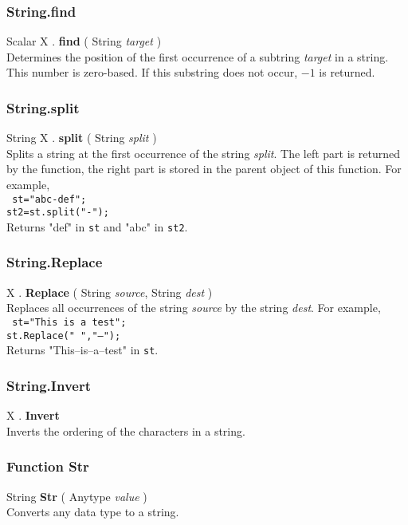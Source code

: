 \documentclass[10pt]{book}
\newcommand{\sourcecode}[1]{\texttt{#1}}
\newcommand{\var}[1]{\textit{#1}}
\begin{document}
\subsubsection{String.find \label{F:String:find}}
Scalar X . \textbf{find} ( String \textit{target} ) \\
Determines the position of the first occurrence of a subtring \var{target} in a string. This number is zero-based. If this substring does not occur, $-1$ is returned.

\subsubsection{String.split \label{F:String:split}}
String X . \textbf{split} ( String \textit{split} ) \\
Splits a string at the first occurrence of the string \var{split}. The left part is returned by the function, the right part is stored in the parent object of this function. For example, \\
\sourcecode{
st="abc-def"; \\
st2=st.split("-"); \\
}
Returns "def" in \sourcecode{st} and "abc" in \sourcecode{st2}.

\subsubsection{String.Replace \label{F:String:Replace}}
X . \textbf{Replace} ( String \textit{source}, String \textit{dest} ) \\
Replaces all occurrences of the string \var{source} by the string \var{dest}.
For example, \\
\sourcecode{
st="This is a test"; \\
st.Replace(" ","--"); \\
}
Returns "This--is--a--test" in \sourcecode{st}.


\subsubsection{String.Invert \label{F:String:Invert}}
X . \textbf{Invert} \\
Inverts the ordering of the characters in a string.

\subsubsection{Function Str \label{F:Str}}
String \textbf{Str} ( Anytype \textit{value} ) \\
Converts any data type to a string.
\end{document}
